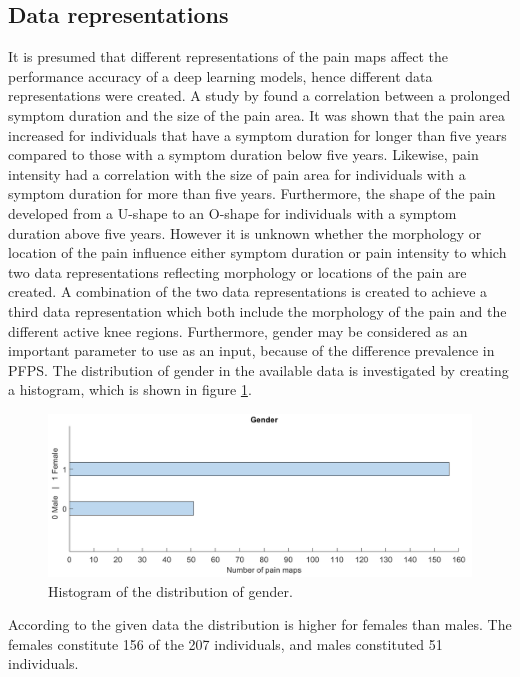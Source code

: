 \subsection{Data representations} \label{sec:representation}
It is presumed that different representations of the pain maps affect the performance accuracy of a deep learning models, hence different data representations were created.
A study by \citeauthor{Boudreau2017} found a correlation between a prolonged symptom duration and the size of the pain area. It was shown that the pain area increased for individuals that have a symptom duration for longer than five years compared to those with a symptom duration below five years. Likewise, pain intensity had a correlation with the size of pain area for individuals with a symptom duration for more than five years. Furthermore, the shape of the pain developed from a U-shape to an O-shape for individuals with a symptom duration above five years.\citep{Boudreau2017} However it is unknown whether the morphology or location of the pain influence either symptom duration or pain intensity to which two data representations reflecting morphology or locations of the pain are created.
A combination of the two data representations is created to achieve a third data representation which both include the morphology of the pain and the different active knee regions.
\noindent
Furthermore, gender may be considered as an important parameter to use as an input, because of the difference prevalence in PFPS. The distribution of gender in the available data is investigated by creating a histogram, which is shown in figure \ref{fig:histogender}.

\begin{figure} [H]
\centering
\includegraphics[width=1\textwidth]{figures/histoGender}
\caption{Histogram of the distribution of gender.}
\label{fig:histogender}
\end{figure}

\noindent
According to the given data the distribution is higher for females than males. The females constitute 156 of the 207 individuals, and males constituted 51 individuals.  \newline

